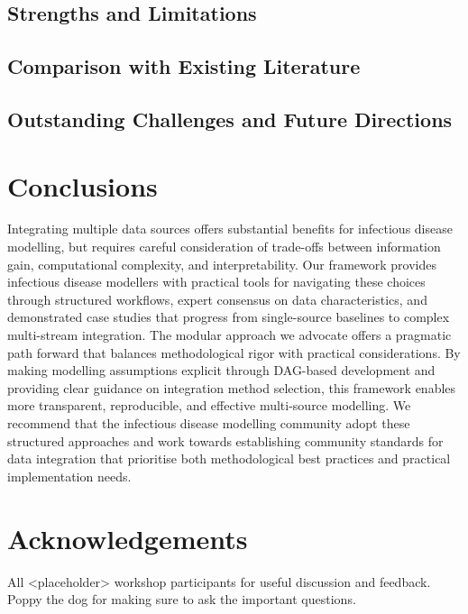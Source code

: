 \documentclass{article}
\begin{document}
\subsection{Strengths and Limitations}

\subsection{Comparison with Existing Literature}

\subsection{Outstanding Challenges and Future Directions}

\section{Conclusions}

Integrating multiple data sources offers substantial benefits for infectious disease modelling, but requires careful consideration of trade-offs between information gain, computational complexity, and interpretability.
Our framework provides infectious disease modellers with practical tools for navigating these choices through structured workflows, expert consensus on data characteristics, and demonstrated case studies that progress from single-source baselines to complex multi-stream integration.
The modular approach we advocate offers a pragmatic path forward that balances methodological rigor with practical considerations.
By making modelling assumptions explicit through DAG-based development and providing clear guidance on integration method selection, this framework enables more transparent, reproducible, and effective multi-source modelling.
We recommend that the infectious disease modelling community adopt these structured approaches and work towards establishing community standards for data integration that prioritise both methodological best practices and practical implementation needs.

\section{Acknowledgements}

All <placeholder> workshop participants for useful discussion and feedback. Poppy the dog for making sure to ask the important questions.



\end{document}
